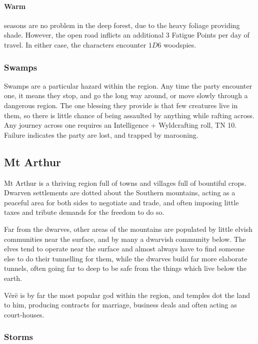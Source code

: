 \begin{multicols}{2}
{\paragraph{Warm} seasons are no problem in the deep forest, due to the heavy foliage providing shade.
However, the open road inflicts an additional 3 Fatigue Points per day of travel.
In either case, the characters encounter $1D6$ woodspies.

}

\subsubsection{Swamps}

Swamps are a particular hazard within the region.
Any time the party encounter one, it means they stop, and go the long way around, or move slowly through a dangerous region.
The one blessing they provide is that few creatures live in them, so there is little chance of being assaulted by anything while rafting across.
Any journey across one requires an Intelligence + Wyldcrafting roll, TN 10.
Failure indicates the party are lost, and trapped by marooning.

\subsection{Mt Arthur}


Mt Arthur is a thriving region full of towns and villages full of bountiful crops.
Dwarven settlements are dotted about the Southern mountains, acting as a peaceful area for both sides to negotiate and trade, and often imposing little taxes and tribute demands for the freedom to do so.

Far from the dwarves, other areas of the mountains are populated by little elvish communities near the surface, and by many a dwarvish community below.
The elves tend to operate near the surface and almost always have to find someone else to do their tunnelling for them, while the dwarves build far more elaborate tunnels, often going far to deep to be safe from the things which live below the earth.

V\'{e}r\"{e} is by far the most popular god within the region, and temples dot the land to him, producing contracts for marriage, business deals and often acting as court-houses.

\subsubsection{Storms}


\end{multicols}
